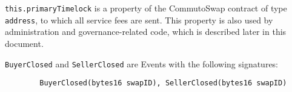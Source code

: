 \documentclass[11pt]{article}
\begin{document}
    \verb|this.primaryTimelock| is a property of the CommutoSwap contract of type \verb|address|, to
    which all service fees are sent.
    This property is also used by administration and governance-related code, which is described
    later in this document.

    \verb|BuyerClosed| and \verb|SellerClosed| are Events with the following signatures:
    \begin{verbatim}
        BuyerClosed(bytes16 swapID), SellerClosed(bytes16 swapID)
    \end{verbatim}
\end{document}
